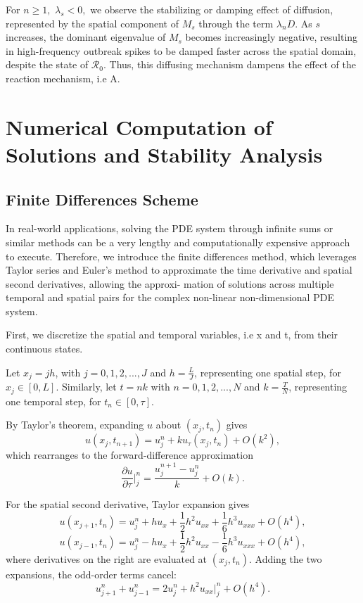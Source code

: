 \documentclass[12pt]{article}
\begin{document}
For $n \geq 1,$  $\lambda_s <0,$ we observe the stabilizing or damping effect of diffusion, represented by the spatial component of $M_s$ through the term $\lambda_n D. $ As $s$ increases, the dominant eigenvalue of $M_s$ becomes increasingly negative, resulting in high-frequency outbreak spikes to be damped faster across the spatial domain, despite the state of $\mathcal{R}_0$. Thus, this diffusing mechanism dampens the effect of the reaction mechanism, i.e A.

\section{Numerical Computation of Solutions and Stability Analysis}

\subsection{Finite Differences Scheme}
In real-world applications, solving the PDE system through infinite sums or similar methods
can be a very lengthy and computationally expensive approach to execute. Therefore, we
introduce the finite differences method, which leverages Taylor series and Euler’s method
to approximate the time derivative and spatial second derivatives, allowing the approxi-
mation of solutions across multiple temporal and spatial pairs for the complex non-linear
non-dimensional PDE system.

First, we discretize the spatial and temporal variables, i.e x and t, from their continuous
states.

Let \(x_j = jh\), with \(j = 0, 1, 2, ..., J\) and \(h = \frac{L}{J}\), representing one spatial step, for
\(x_j \in [0, L]\). Similarly, let \(t = nk\) with \(n = 0, 1, 2, . . . , N\) and \(k = \frac{T}{N}\), representing
one temporal step, for \(t_n \in [0, \tau]\).

By Taylor’s theorem, expanding \(u\) about \((x_j , t_n)\) gives
\[
u(x_j , t_{n+1}) = u^n_j + k u_\tau (x_j , t_n) + O(k^2),
\]
which rearranges to the forward-difference approximation
\[
\frac{\partial u}{\partial \tau}\bigg|^n_j
=
\frac{u^{n+1}_j - u^n_j}{k} + O(k).
\]

For the spatial second derivative, Taylor expansion gives
\[
u(x_{j+1}, t_n) = u^n_j + h u_x + \frac{1}{2} h^2u_{xx} + \frac{1}{6}h^3u_{xxx} + O(h^4),
\]
\[
u(x_{j-1}, t_n) = u^n_j - h u_x + \frac{1}{2} h^2u_{xx} - \frac{1}{6}h^3u_{xxx} + O(h^4),
\]
where derivatives on the right are evaluated at \((x_j , t_n)\). Adding the two expansions, the
odd-order terms cancel:
\[
u^n_{j+1} + u^n_{j-1} = 2u^n_j + h^2 u_{xx}\bigg|^n_j + O(h^4).
\]
\end{document}
